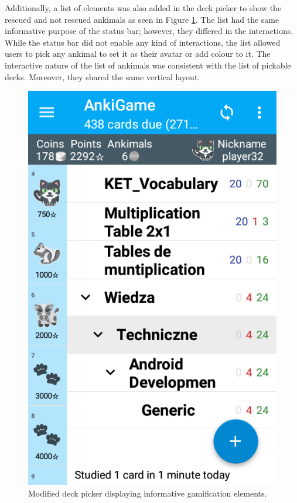 Additionally, a list of elements was also added in the deck picker to show the rescued and not rescued ankimals as seen in Figure \ref{fig:progress}. The list had the same informative purpose of the status bar; however, they differed in the interactions. While the status bar did not enable any kind of interactions, the list allowed users to pick any ankimal to set it as their avatar or add colour to it. The interactive nature of the list of ankimals was consistent with the list of pickable decks. Moreover, they shared the same vertical layout.

\begin{figure}[htb]
    \vskip 5mm
        \begin{center}
            \includegraphics[scale=0.4]{./Figures/progress.png}
            \caption{Modified deck picker displaying informative gamification elements.}
            \label{fig:progress}
        \end{center}
    \vskip -5mm
\end{figure}

